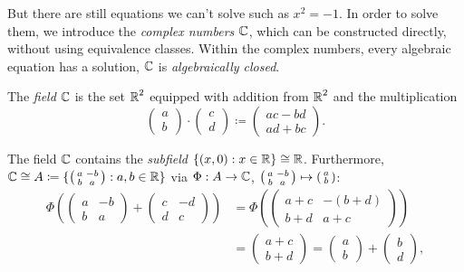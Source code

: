 \documentclass[a4paper,english]{article}
\begin{document}
But there are still equations we can't solve such as $x^2 = -1$.
In order to solve them, we introduce the \emph{complex numbers $\CC$}, which can be constructed directly, without using equivalence classes.
Within the complex numbers, every algebraic equation has a solution, $\CC$ is \emph{algebraically closed}.
\normalsize

\begin{defn}[$\CC$, Version I] \label{defn:CC}
    The \emph{field} $\CC$ is the set $\operatorname{\mathbb{R}}^2$ equipped with addition from $\operatorname{\mathbb{R}}^2$ and the multiplication
    \begin{equation*}
        \begin{pmatrix} a \\ b \end{pmatrix}
        \cdot \begin{pmatrix} c \\ d \end{pmatrix}
        \coloneqq \begin{pmatrix}
            a c - b d \\
            a d + b c
        \end{pmatrix}.
    \end{equation*}
\end{defn}
The field $\CC$ contains the \emph{subfield} $\{ (x, 0): x \in \operatorname{\mathbb{R}}\} \cong \operatorname{\mathbb{R}}$.
Furthermore, $\operatorname{\mathbb{C}} \cong A \coloneqq \{ \begin{psmallmatrix} a & - b \\ b & a \end{psmallmatrix}: a,b \in \operatorname{\mathbb{R}}\}$ via $\Phi: A \to \operatorname{\mathbb{C}}$, $\begin{psmallmatrix} a & - b \\ b & a \end{psmallmatrix} \mapsto \begin{psmallmatrix} a \\ b \end{psmallmatrix}$:
\begin{align*}
    \Phi\left(\begin{pmatrix} a & - b \\ b & a \end{pmatrix} + \begin{pmatrix} c & - d \\ d & c \end{pmatrix}\right)
    & = \Phi\left(\begin{pmatrix} a + c & - (b + d) \\ b + d & a +c \end{pmatrix}\right) \\
    & = \begin{pmatrix} a + c \\ b + d \end{pmatrix}
    = \begin{pmatrix} a \\ b \end{pmatrix} + \begin{pmatrix} b \\ d \end{pmatrix},
\end{align*}
\end{document}
